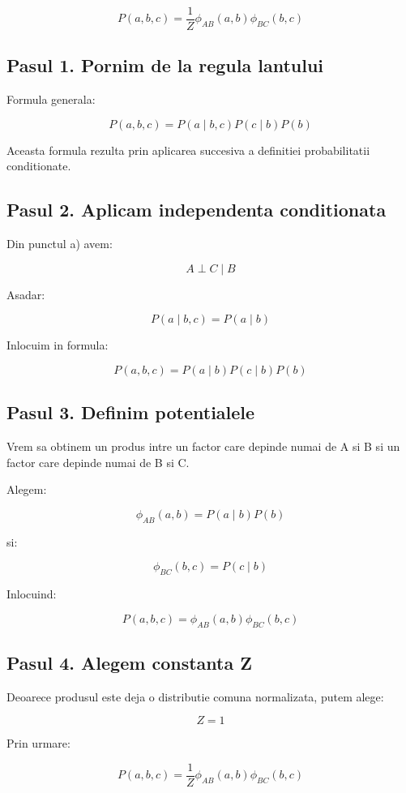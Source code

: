 \documentclass[12pt,a4paper]{article}
\begin{document}
\[
\boxed{
P(a,b,c)=
\frac{1}{Z}\phi_{AB}(a,b)\phi_{BC}(b,c)
}
\]

\subsection*{Pasul 1. Pornim de la regula lantului}

Formula generala:

\[
P(a,b,c)=P(a\mid b,c)P(c\mid b)P(b)
\]

Aceasta formula rezulta prin aplicarea succesiva a definitiei probabilitatii conditionate.

\subsection*{Pasul 2. Aplicam independenta conditionata}

Din punctul a) avem:

\[
A\perp C\mid B
\]

Asadar:

\[
P(a\mid b,c)=P(a\mid b)
\]

Inlocuim in formula:

\[
\boxed{
P(a,b,c)=P(a\mid b)P(c\mid b)P(b)
}
\]

\subsection*{Pasul 3. Definim potentialele}

Vrem sa obtinem un produs intre un factor care depinde numai de A si B si un factor care depinde numai de B si C.

Alegem:

\[
\boxed{
\phi_{AB}(a,b)=P(a\mid b)P(b)
}
\]

si:

\[
\boxed{
\phi_{BC}(b,c)=P(c\mid b)
}
\]

Inlocuind:

\[
P(a,b,c)=\phi_{AB}(a,b)\phi_{BC}(b,c)
\]

\subsection*{Pasul 4. Alegem constanta Z}

Deoarece produsul este deja o distributie comuna normalizata, putem alege:

\[
\boxed{Z=1}
\]

Prin urmare:

\[
\boxed{
P(a,b,c)=
\frac{1}{Z}\phi_{AB}(a,b)\phi_{BC}(b,c)
}
\]
\end{document}
